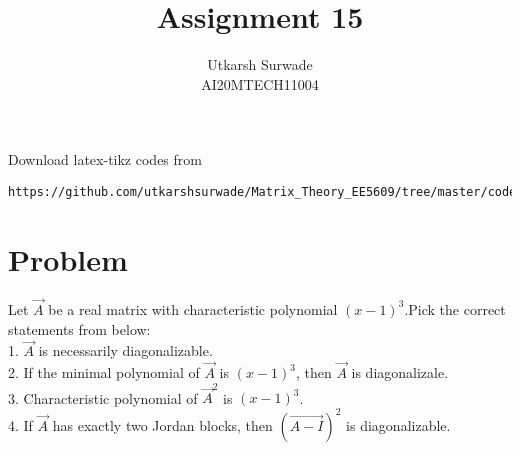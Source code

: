 \documentclass[journal,12pt]{IEEEtran}
\begin{document}
     \def\rightbox#1{\makebox[0in][r]{#1}}
     \def\centbox#1{\makebox[0in]{#1}}
     \def\topbox#1{\raisebox{-\baselineskip}[0in][0in]{#1}}
     \def\midbox#1{\raisebox{-0.5\baselineskip}[0in][0in]{#1}}
\vspace{3cm}
\title{Assignment 15}
\author{Utkarsh Surwade\\AI20MTECH11004}
\maketitle
\bigskip
\renewcommand{\thefigure}{\theenumi}
\renewcommand{\thetable}{\theenumi}
Download latex-tikz codes from 
%
\begin{lstlisting}
https://github.com/utkarshsurwade/Matrix_Theory_EE5609/tree/master/codes
\end{lstlisting}
%
 
\section{\textbf{Problem}}
Let $\vec{A}$ be a real matrix with characteristic polynomial $(x-1)^3$.Pick the correct statements from below:\\
1. $\vec{A}$ is necessarily diagonalizable.\\
2. If the minimal polynomial of $\vec{A}$ is $(x-1)^3$, then $\vec{A}$ is diagonalizale.\\
3. Characteristic polynomial of $\vec{A}^2$ is $(x-1)^3$.\\
4. If $\vec{A}$ has exactly two Jordan blocks, then $(\vec{A-I})^2$ is diagonalizable.
\end{document}
